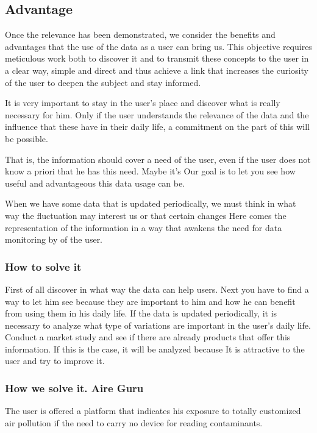 \subsection{Advantage}
Once the relevance has been demonstrated, we consider the benefits and advantages that the use of the data as a user can bring us.
This objective requires meticulous work both to discover it and to transmit these concepts to the user in a clear way,
simple and direct and thus achieve a link that increases the curiosity of the user to deepen the subject and
stay informed.

It is very important to stay in the user's place and discover what is really necessary for him. Only if the user understands the relevance of
the data and the influence that these have in their daily life, a commitment on the part of this will be possible.

That is, the information should cover a need of the user, even if the user does not know a priori that he has this need. Maybe it's
Our goal is to let you see how useful and advantageous this data usage can be.

When we have some data that is updated periodically, we must think in what way the fluctuation may interest us or that certain
changes Here comes the representation of the information in a way that awakens the need for data monitoring by
of the user.

\subsubsection{How to solve it} 
First of all discover in what way the data can help users. Next you have to find a way to let him see
because they are important to him and how he can benefit from using them in his daily life.
If the data is updated periodically, it is necessary to analyze what type of variations are important in the user's daily life.
Conduct a market study and see if there are already products that offer this information. If this is the case, it will be analyzed because
It is attractive to the user and try to improve it.

\subsubsection{How we solve it. Aire Guru} 
The user is offered a platform that indicates his exposure to totally customized air pollution if the need to carry
no device for reading contaminants.



